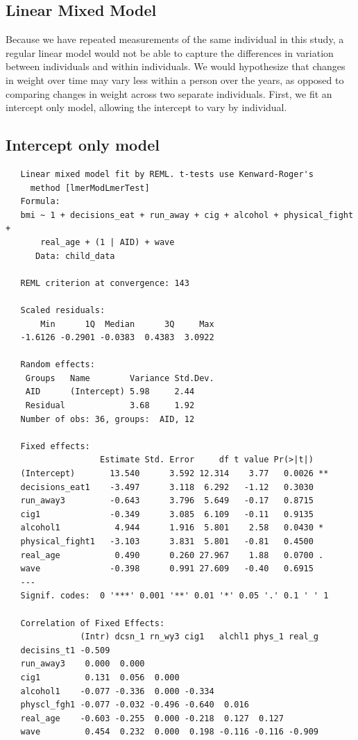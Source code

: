 \documentclass[12pt, twoside]{amherstthesis}
\begin{document}
\hypertarget{linear-mixed-model}{%
\subsection{Linear Mixed Model}\label{linear-mixed-model}}

Because we have repeated measurements of the same individual in this study, a regular linear model would not be able to capture the differences in variation between individuals and within individuals. We would hypothesize that changes in weight over time may vary less within a person over the years, as opposed to comparing changes in weight across two separate individuals. First, we fit an intercept only model, allowing the intercept to vary by individual.

\hypertarget{intercept-only-model}{%
\subsection{Intercept only model}\label{intercept-only-model}}
\begin{verbatim}
   Linear mixed model fit by REML. t-tests use Kenward-Roger's
     method [lmerModLmerTest]
   Formula: 
   bmi ~ 1 + decisions_eat + run_away + cig + alcohol + physical_fight +  
       real_age + (1 | AID) + wave
      Data: child_data
   
   REML criterion at convergence: 143
   
   Scaled residuals: 
       Min      1Q  Median      3Q     Max 
   -1.6126 -0.2901 -0.0383  0.4383  3.0922 
   
   Random effects:
    Groups   Name        Variance Std.Dev.
    AID      (Intercept) 5.98     2.44    
    Residual             3.68     1.92    
   Number of obs: 36, groups:  AID, 12
   
   Fixed effects:
                   Estimate Std. Error     df t value Pr(>|t|)   
   (Intercept)       13.540      3.592 12.314    3.77   0.0026 **
   decisions_eat1    -3.497      3.118  6.292   -1.12   0.3030   
   run_away3         -0.643      3.796  5.649   -0.17   0.8715   
   cig1              -0.349      3.085  6.109   -0.11   0.9135   
   alcohol1           4.944      1.916  5.801    2.58   0.0430 * 
   physical_fight1   -3.103      3.831  5.801   -0.81   0.4500   
   real_age           0.490      0.260 27.967    1.88   0.0700 . 
   wave              -0.398      0.991 27.609   -0.40   0.6915   
   ---
   Signif. codes:  0 '***' 0.001 '**' 0.01 '*' 0.05 '.' 0.1 ' ' 1
   
   Correlation of Fixed Effects:
               (Intr) dcsn_1 rn_wy3 cig1   alchl1 phys_1 real_g
   decisins_t1 -0.509                                          
   run_away3    0.000  0.000                                   
   cig1         0.131  0.056  0.000                            
   alcohol1    -0.077 -0.336  0.000 -0.334                     
   physcl_fgh1 -0.077 -0.032 -0.496 -0.640  0.016              
   real_age    -0.603 -0.255  0.000 -0.218  0.127  0.127       
   wave         0.454  0.232  0.000  0.198 -0.116 -0.116 -0.909
\end{verbatim}
\end{document}
